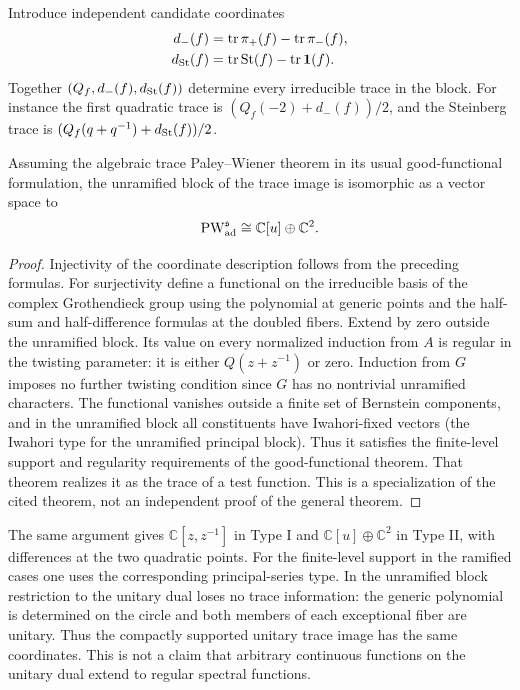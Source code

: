 Introduce independent candidate coordinates
\begin{align*}
d_-(f)&=\operatorname{tr}\pi_+(f)-\operatorname{tr}\pi_-(f),\\
d_{\rm St}(f)&=\operatorname{tr}\mathrm{St}(f)-\operatorname{tr}\mathbf1(f).
\end{align*}
Together $(Q_f,d_-(f),d_{\rm St}(f))$ determine every irreducible trace in the block. For instance the first quadratic trace is $(Q_f(-2)+d_-(f))/2$, and the Steinberg trace is $(Q_f(q+q^{-1})+d_{\rm St}(f))/2$.
\begin{proposition}\label{prop:algebraic-pw}
Assuming the algebraic trace Paley--Wiener theorem in its usual good-functional formulation, the unramified block of the trace image is isomorphic as a vector space to
\[\operatorname{PW}_{\rm ad}^{\mathfrak s}\cong\mathbb C[u]\oplus\mathbb C^2.\]
\end{proposition}
\begin{proof}
Injectivity of the coordinate description follows from the preceding formulas. For surjectivity define a functional on the irreducible basis of the complex Grothendieck group using the polynomial at generic points and the half-sum and half-difference formulas at the doubled fibers. Extend by zero outside the unramified block. Its value on every normalized induction from $A$ is regular in the twisting parameter: it is either $Q(z+z^{-1})$ or zero. Induction from $G$ imposes no further twisting condition since $G$ has no nontrivial unramified characters. The functional vanishes outside a finite set of Bernstein components, and in the unramified block all constituents have Iwahori-fixed vectors (the Iwahori type for the unramified principal block). Thus it satisfies the finite-level support and regularity requirements of the good-functional theorem. That theorem realizes it as the trace of a test function. This is a specialization of the cited theorem, not an independent proof of the general theorem.
\end{proof}
The same argument gives $\mathbb C[z,z^{-1}]$ in Type I and $\mathbb C[u]\oplus\mathbb C^2$ in Type II, with differences at the two quadratic points. For the finite-level support in the ramified cases one uses the corresponding principal-series type. In the unramified block restriction to the unitary dual loses no trace information: the generic polynomial is determined on the circle and both members of each exceptional fiber are unitary. Thus the compactly supported unitary trace image has the same coordinates. This is not a claim that arbitrary continuous functions on the unitary dual extend to regular spectral functions.

